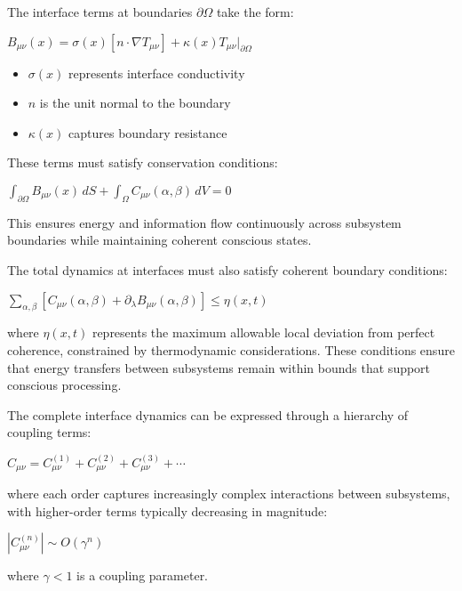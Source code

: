 The interface terms at boundaries $\partial \Omega$ take the form:

$B_{\mu\nu}(x) = \sigma(x)[n \cdot \nabla T_{\mu\nu}] + \kappa(x)T_{\mu\nu}|_{\partial\Omega}$

\begin{itemize}
\item $\sigma(x)$ represents interface conductivity
\item $n$ is the unit normal to the boundary
\item $\kappa(x)$ captures boundary resistance
\end{itemize}

These terms must satisfy conservation conditions:

$\int_{\partial\Omega} B_{\mu\nu}(x)\,dS + \int_\Omega C_{\mu\nu}(\alpha,\beta)\,dV = 0$

This ensures energy and information flow continuously across subsystem boundaries while maintaining coherent conscious states.

The total dynamics at interfaces must also satisfy coherent boundary conditions:

$\sum_{\alpha,\beta} [C_{\mu\nu}(\alpha,\beta) + \partial_\lambda B_{\mu\nu}(\alpha,\beta)] \leq \eta(x,t)$

where $\eta (x,t)$ represents the maximum allowable local deviation from perfect coherence, constrained by thermodynamic considerations. These conditions ensure that energy transfers between subsystems remain within bounds that support conscious processing.

The complete interface dynamics can be expressed through a hierarchy of coupling terms:

$C_{\mu\nu} = C^{(1)}_{\mu\nu} + C^{(2)}_{\mu\nu} + C^{(3)}_{\mu\nu} + \cdots$

where each order captures increasingly complex interactions between subsystems, with higher-order terms typically decreasing in magnitude:

$|C^{(n)}_{\mu\nu}| \sim O(\gamma^n)$

where $\gamma < 1$ is a coupling parameter.

